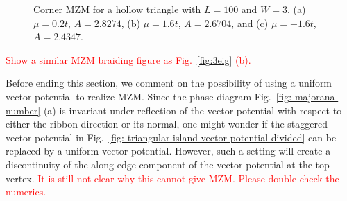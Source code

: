 \documentclass[aps,prb,showpacs,amsmath,twocolumn,amssymb,superscriptaddress]{revtex4-2}
\newcommand{\Red}[1]{\textcolor{red}{#1}}
\begin{document}
\begin{figure}[]
  \hfill
  \hfill
  \hfill
  \caption{Corner MZM for a hollow triangle with $L=100$ and $W=3$. (a) $\mu=0.2t$, $A = 2.8274$, (b) $\mu=1.6t$, $A = 2.6704$, and (c) $\mu=-1.6t$, $A = 2.4347$.}
  \label{fig: mzm-wavefunctions}
\end{figure}

\Red{Show a similar MZM braiding figure as Fig.~\ref{fig:3eig} (b).}

Before ending this section, we comment on the possibility of using a uniform vector potential to realize MZM. Since the phase diagram Fig.~\ref{fig: majorana-number} (a) is invariant under reflection of the vector potential with respect to either the ribbon direction or its normal, one might wonder if the staggered vector potential in Fig.~\ref{fig: triangular-island-vector-potential-divided} can be replaced by a uniform vector potential. However, such a setting will create a discontinuity of the along-edge component of the vector potential at the top vertex. \Red{It is still not clear why this cannot give MZM. Please double check the numerics.}
\end{document}
